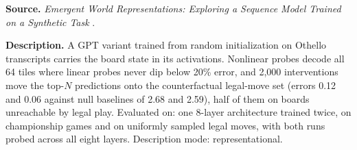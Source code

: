 
\textbf{Source.} \emph{Emergent World Representations: Exploring a Sequence Model Trained on a Synthetic Task} \citep{li2023othello}.

\textbf{Description.} A GPT variant trained from random initialization on Othello transcripts carries the board state in its activations. Nonlinear probes decode all 64 tiles where linear probes never dip below 20\% error, and 2,000 interventions move the top-$N$ predictions onto the counterfactual legal-move set (errors 0.12 and 0.06 against null baselines of 2.68 and 2.59), half of them on boards unreachable by legal play. Evaluated on: one 8-layer architecture trained twice, on championship games and on uniformly sampled legal moves, with both runs probed across all eight layers. Description mode: representational.


